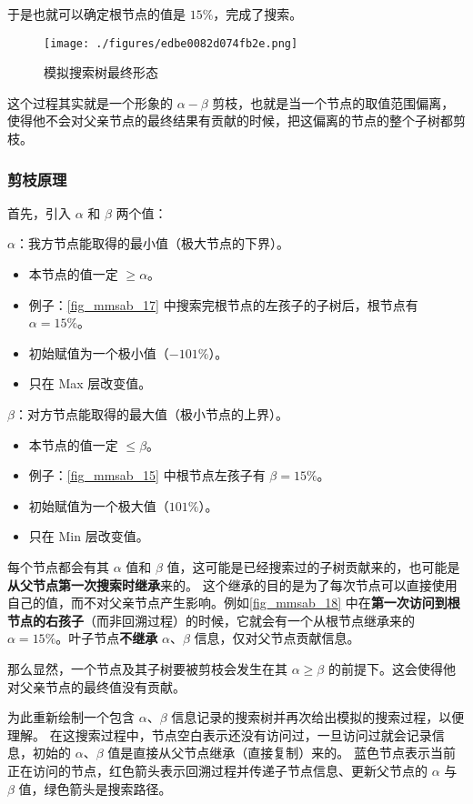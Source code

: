 于是也就可以确定根节点的值是 $15\%$，完成了搜索。

\begin{figure}[ht]
\centering
\texttt{[image: ./figures/edbe0082d074fb2e.png]}
\caption{模拟搜索树最终形态} \label{fig_mmsab_20}
\end{figure}

这个过程其实就是一个形象的 $\alpha-\beta$ 剪枝，也就是当一个节点的取值范围偏离，使得他不会对父亲节点的最终结果有贡献的时候，把这偏离的节点的整个子树都剪枝。

\subsubsection{剪枝原理}

首先，引入 $\alpha$ 和 $\beta$ 两个值：

$\alpha$：我方节点能取得的最小值（极大节点的下界）。
\begin{itemize}
\item 本节点的值一定 $\ge\alpha$。
\item 例子：\autoref{fig_mmsab_17} 中搜索完根节点的左孩子的子树后，根节点有 $\alpha = 15\%$。
\item 初始赋值为一个极小值（$-101\%$）。
\item 只在 Max 层改变值。
\end{itemize}

$\beta$：对方节点能取得的最大值（极小节点的上界）。
\begin{itemize}
\item 本节点的值一定 $\le \beta$。
\item 例子：\autoref{fig_mmsab_15} 中根节点左孩子有 $\beta = 15\%$。
\item 初始赋值为一个极大值（$101\%$）。
\item 只在 Min 层改变值。
\end{itemize}
每个节点都会有其 $\alpha$ 值和 $\beta$ 值，这可能是已经搜索过的子树贡献来的，也可能是\textbf{从父节点第一次搜索时继承}来的。
这个继承的目的是为了每次节点可以直接使用自己的值，而不对父亲节点产生影响。例如\autoref{fig_mmsab_18} 中在\textbf{第一次访问到根节点的右孩子}（而非回溯过程）的时候，它就会有一个从根节点继承来的 $\alpha = 15\%$。叶子节点\textbf{不继承} $\alpha$、$\beta$ 信息，仅对父节点贡献信息。

那么显然，一个节点及其子树要被剪枝会发生在其 $\alpha \ge \beta$ 的前提下。这会使得他对父亲节点的最终值没有贡献。

为此重新绘制一个包含 $\alpha$、$\beta$ 信息记录的搜索树并再次给出模拟的搜索过程，以便理解。
在这搜索过程中，节点空白表示还没有访问过，一旦访问过就会记录信息，初始的 $\alpha$、$\beta$ 值是直接从父节点继承（直接复制）来的。
蓝色节点表示当前正在访问的节点，红色箭头表示回溯过程并传递子节点信息、更新父节点的 $\alpha$ 与 $\beta$ 值，绿色箭头是搜索路径。

